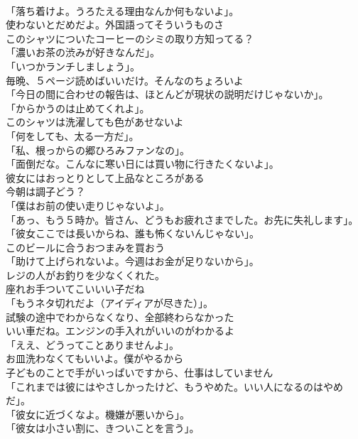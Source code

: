 \documentclass[8pt]{extreport}
\begin{document}
\begin{CJK}{UTF8}{min}
\\	「落ち着けよ。うろたえる理由なんか何もないよ」。	
\\	使わないとだめだよ。外国語ってそういうものさ	
\\	このシャツについたコーヒーのシミの取り方知ってる？	
\\	「濃いお茶の渋みが好きなんだ」。	
\\	「いつかランチしましょう」。	
\\	毎晩、５ページ読めばいいだけ。そんなのちょろいよ	
\\	「今日の間に合わせの報告は、ほとんどが現状の説明だけじゃないか」。	
\\	「からかうのは止めてくれよ」。	
\\	このシャツは洗濯しても色があせないよ	
\\	「何をしても、太る一方だ」。	
\\	「私、根っからの郷ひろみファンなの」。	
\\	「面倒だな。こんなに寒い日には買い物に行きたくないよ」。	
\\	彼女にはおっとりとして上品なところがある	
\\	今朝は調子どう？	
\\	「僕はお前の使い走りじゃないよ」。	
\\	「あっ、もう５時か。皆さん、どうもお疲れさまでした。お先に失礼します」。	
\\	「彼女ここでは長いからね、誰も怖くないんじゃない」。	
\\	このビールに合うおつまみを買おう	
\\	「助けて上げられないよ。今週はお金が足りないから」。	
\\	レジの人がお釣りを少なくくれた。	
\\	座れお手ついてこいいい子だね	
\\	「もうネタ切れだよ（アイディアが尽きた）」。	
\\	試験の途中でわからなくなり、全部終わらなかった	
\\	いい車だね。エンジンの手入れがいいのがわかるよ	
\\	「ええ、どうってことありませんよ」。	
\\	お皿洗わなくてもいいよ。僕がやるから	
\\	子どものことで手がいっぱいですから、仕事はしていません	
\\	「これまでは彼にはやさしかったけど、もうやめた。いい人になるのはやめだ」。	
\\	「彼女に近づくなよ。機嫌が悪いから」。	
\\	「彼女は小さい割に、きついことを言う」。	

\end{CJK}
\end{document}
